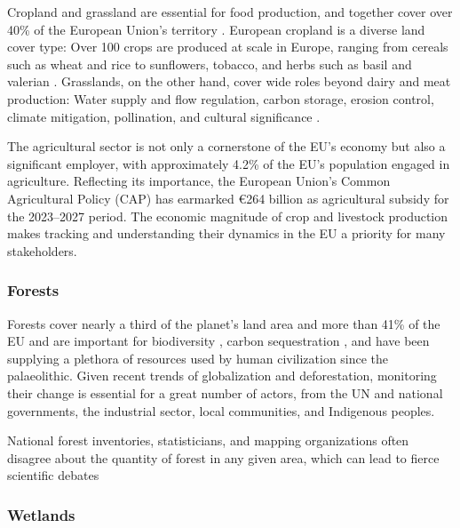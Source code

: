         Cropland and grassland are essential for food production, and together cover over 40\% of the European Union's territory \citep{eurostat2021land}. European cropland is a diverse land cover type: Over 100 crops are produced at scale in Europe, ranging from cereals such as wheat and rice to sunflowers, tobacco, and herbs such as basil and valerian \citep{eurostat2023agricultural}. Grasslands, on the other hand, cover wide roles beyond dairy and meat production: Water supply and flow regulation, carbon storage, erosion control, climate mitigation, pollination, and cultural significance \citep{bengtsson2019grasslands}. 
        
        The agricultural sector is not only a cornerstone of the EU's economy but also a significant employer, with approximately 4.2\% of the EU's population engaged in agriculture. Reflecting its importance, the European Union's Common Agricultural Policy (CAP) has earmarked €264 billion as agricultural subsidy for the 2023–2027 period. The economic magnitude of crop and livestock production makes tracking and understanding their dynamics in the EU a priority for many stakeholders.

    \subsubsection*{Forests}

        Forests cover nearly a third of the planet's land area \citep{fao2022,banskota2014forest} and more than 41\% of the EU \citep{eurostat2021land} and are important for biodiversity \citep{cazzolla2022number}, carbon sequestration \citep{ipcc2021}, and have been supplying a plethora of resources used by human civilization since the palaeolithic. Given recent trends of globalization and deforestation, monitoring their change is essential \citep{sy2019} for a great number of actors, from the UN and national governments, the industrial sector, local communities, and Indigenous peoples.

        National forest inventories, statisticians, and mapping organizations often disagree about the quantity of forest in any given area, which can lead to fierce scientific debates \citep{picard2021recent, korhonen2020new, palahi2021concerns, rossi2019assessing}
    
    \subsubsection*{Wetlands}

